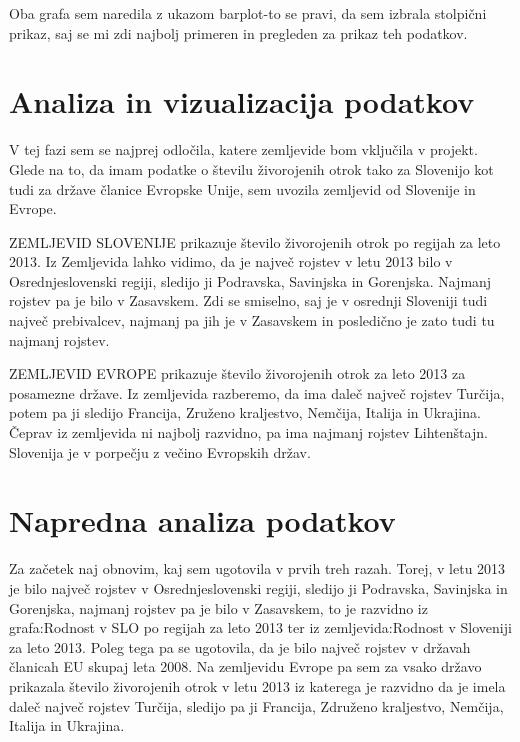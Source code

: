 \documentclass[11pt,a4paper]{article}
\begin{document}
Oba grafa sem naredila z ukazom barplot-to se pravi, da sem izbrala stolpični prikaz, saj se mi zdi najbolj primeren in pregleden za prikaz teh podatkov.



\newpage
\section{Analiza in vizualizacija podatkov}



V tej fazi sem se najprej odločila, katere zemljevide bom vključila v projekt. Glede na to, da imam podatke o številu živorojenih otrok tako za Slovenijo kot tudi za države članice Evropske Unije, sem uvozila zemljevid od Slovenije in Evrope.

ZEMLJEVID SLOVENIJE prikazuje število živorojenih otrok po regijah za leto 2013. Iz Zemljevida lahko vidimo, da je največ rojstev v letu 2013 bilo v Osrednjeslovenski regiji, sledijo ji Podravska, Savinjska in Gorenjska. Najmanj rojstev pa je bilo v Zasavskem. Zdi se smiselno, saj je v osrednji Sloveniji tudi največ prebivalcev, najmanj pa jih je v Zasavskem in posledično je zato tudi tu najmanj rojstev.




\newpage
ZEMLJEVID EVROPE prikazuje število živorojenih otrok za leto 2013 za posamezne države. Iz zemljevida razberemo, da ima daleč največ rojstev Turčija, potem pa ji sledijo Francija, Zruženo kraljestvo, Nemčija, Italija in Ukrajina. Čeprav iz zemljevida ni najbolj razvidno, pa ima najmanj rojstev Lihtenštajn. Slovenija je v porpečju z večino Evropskih držav.


\newpage

 
\section{Napredna analiza podatkov}


Za začetek naj obnovim, kaj sem ugotovila v prvih treh razah. Torej, v letu 2013 je bilo največ rojstev v Osrednjeslovenski regiji, sledijo ji Podravska, Savinjska in Gorenjska, najmanj rojstev pa je bilo  v Zasavskem, to je razvidno iz grafa:Rodnost v SLO po regijah za leto 2013 ter iz zemljevida:Rodnost v Sloveniji za leto 2013.
Poleg tega pa se ugotovila, da je bilo največ rojstev v državah članicah EU skupaj leta 2008.
Na zemljevidu Evrope pa sem za vsako državo prikazala število živorojenih otrok v letu 2013 iz katerega je razvidno da je imela daleč največ rojstev Turčija, sledijo pa ji Francija, Združeno kraljestvo, Nemčija, Italija in Ukrajina.
\end{document}
